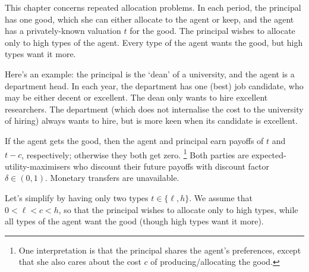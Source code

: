 






This chapter concerns repeated allocation problems.
In each period, the principal has one good, which she can either allocate to the agent or keep,
and the agent has a privately-known valuation $t$ for the good.
The principal wishes to allocate only to high types of the agent.
Every type of the agent wants the good, but high types want it more.

Here's an example: the principal is the `dean' of a university, and the agent is a department head. In each year, the department has one (best) job candidate, who may be either decent or excellent.
The dean only wants to hire excellent researchers.
The department (which does not internalise the cost to the university of hiring) always wants to hire, but is more keen when its candidate is excellent.

If the agent gets the good, then the agent and principal earn payoffs of $t$ and $t-c$, respectively; otherwise they both get zero.%
	\footnote{One interpretation is that the principal shares the agent's preferences, except that she also cares about the cost $c$ of producing/allocating the good.}
Both parties are expected-utility-maximisers who discount their future payoffs with discount factor $\delta \in (0,1)$.
Monetary transfers are unavailable.

Let's simplify by having only two types $t \in \{\ell,h\}$.
We assume that $0 < \ell < c < h$,
so that the principal wishes to allocate only to high types,
while all types of the agent want the good (though high types want it more).

